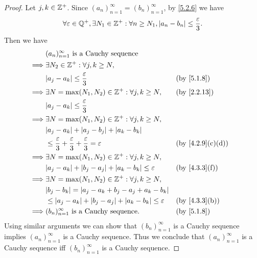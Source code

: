 \begin{proof}
  Let \(j, k \in \mathbb{Z}^+\).
  Since \((a_n)_{n = 1}^\infty = (b_n)_{n = 1}^\infty\), by \cref{5.2.6} we have
  \[
    \forall \varepsilon \in \mathbb{Q}^+, \exists N_1 \in \mathbb{Z}^+ : \forall n \geq N_1, \left\lvert a_n - b_n\right\rvert \leq \dfrac{\varepsilon}{3}.
  \]
  Then we have
  \begin{align*}
             & (a_n)_{n = 1}^\infty \text{ is a Cauchy sequence}                                                                               \\
    \implies & \exists N_2 \in \Z^+ : \forall j, k \geq N,                                                                                     \\
             & \abs{a_j - a_k} \leq \dfrac{\varepsilon}{3}                                                 &  & \by{5.1.8}                     \\
    \implies & \exists N = \max(N_1, N_2) \in \Z^+ : \forall j, k \geq N,                                  &  & \by{2.2.13}                    \\
             & \abs{a_j - a_k} \leq \dfrac{\varepsilon}{3}                                                                                     \\
    \implies & \exists N = \max(N_1, N_2) \in \Z^+ : \forall j, k \geq N,                                                                      \\
             & \abs{a_j - a_k} + \abs{a_j - b_j} + \abs{a_k - b_k}                                                                             \\
             & \leq \dfrac{\varepsilon}{3} + \dfrac{\varepsilon}{3} + \dfrac{\varepsilon}{3} = \varepsilon &  & \text{(by \cref{4.2.9}(c)(d))} \\
    \implies & \exists N = \max(N_1, N_2) \in \Z^+ : \forall j, k \geq N,                                                                      \\
             & \abs{a_j - a_k} + \abs{b_j - a_j} + \abs{a_k - b_k} \leq \varepsilon                        &  & \text{(by \cref{4.3.3}(f))}    \\
    \implies & \exists N = \max(N_1, N_2) \in \Z^+ : \forall j, k \geq N,                                                                      \\
             & \abs{b_j - b_k} = \abs{a_j - a_k + b_j - a_j + a_k - b_k}                                                                       \\
             & \leq \abs{a_j - a_k} + \abs{b_j - a_j} + \abs{a_k - b_k} \leq \varepsilon                   &  & \text{(by \cref{4.3.3}(b))}    \\
    \implies & (b_n)_{n = 1}^\infty \text{ is a Cauchy sequence}.                                          &  & \by{5.1.8}
  \end{align*}
  Using similar arguments we can show that \((b_n)_{n = 1}^\infty\) is a Cauchy sequence implies \((a_n)_{n = 1}^\infty\) is a Cauchy sequence.
  Thus we conclude that \((a_n)_{n = 1}^\infty\) is a Cauchy sequence iff \((b_n)_{n = 1}^\infty\) is a Cauchy sequence.
\end{proof}

